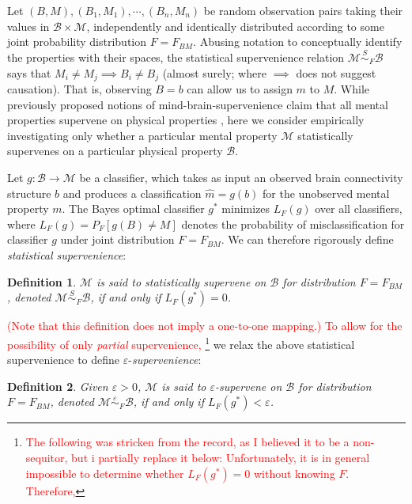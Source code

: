 \documentclass{article}
\newcommand{\mB}{\mathcal{B}}
\newcommand{\mM}{\mathcal{M}}
\newcommand{\MeB}{\mM \overset{\varepsilon}{{\sim}}_F \mB}
\providecommand{\tr}[1]{\textcolor{red}{#1}}
\newtheorem{defi}{Definition}
\begin{document}
Let $(B,M), (B_1,M_1),\cdots,(B_n,M_n)$ be random observation pairs taking their values in $\mB \times \mM$, independently and identically distributed according to some joint probability distribution $F=F_{BM}$. Abusing notation to conceptually identify the properties with their spaces, the statistical supervenience relation $\mM \overset{S}{\sim}_F \mB$ says that $M_i \neq M_j \implies B_i \neq B_j$ (almost surely; where $\implies$ does not suggest causation). That is, observing $B=b$ can allow us to assign $m$ to $M$. While previously proposed notions of mind-brain-supervenience claim that all mental properties supervene on physical properties \cite{Kim95}, here we consider empirically investigating only whether a particular mental property $\mM$ statistically supervenes on a particular physical property $\mB$.

Let $g:\mB \rightarrow \mM$ be a classifier, which takes as input an observed brain connectivity structure $b$ and produces a classification $\widehat{m}=g(b)$ for the unobserved mental property $m$. The Bayes optimal classifier $g^*$ minimizes $L_{F}(g)$ over all classifiers, where $L_{F}(g) = P_{F}[g(B) \neq M]$ denotes the probability of misclassification for classifier $g$ under joint distribution $F=F_{BM}$. We can therefore rigorously define \textit{statistical supervenience}:

\begin{defi}
\label{def1} 
$\mM$ is said to \textit{statistically supervene} on $\mB$ for distribution $F=F_{BM}$, denoted $\mM \overset{S}{\sim}_F \mB$, if and only if $L_{F}(g^*) = 0$.
\end{defi}

\tr{(Note that this definition does not imply a one-to-one mapping.)}  \tr{To allow for the possibility of only \emph{partial} supervenience,} \footnote{\tr{The following was stricken from the record, as I believed it to be a non-sequitor, but i partially replace it below: Unfortunately, it is in general impossible to determine whether $L_F(g^*)=0$ without knowing $F$. Therefore,}} we relax the above statistical supervenience to define $\varepsilon$-\textit{supervenience}:

\begin{defi}
\label{def2}
Given $\varepsilon > 0$, $\mM$ is said to $\varepsilon$-\textit{supervene} on $\mB$ for distribution $F=F_{BM}$, denoted $\MeB$, if and only if $L_{F}(g^*) < \varepsilon$.
\end{defi}
\end{document}
